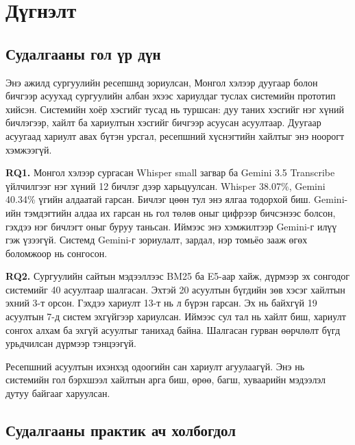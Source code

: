 \chapter{Дүгнэлт}
\label{ch:conclusion}


\section{Судалгааны гол үр дүн}
\label{sec:concl-main}

Энэ ажилд сургуулийн ресепшнд зориулсан, Монгол хэлээр дуугаар болон бичгээр асуухад сургуулийн албан эхээс хариулдаг туслах системийн прототип хийсэн. Системийн хоёр хэсгийг тусад нь туршсан: дуу таних хэсгийг нэг хүний бичлэгээр, хайлт ба хариултын хэсгийг бичгээр асуусан асуултаар. Дуугаар асуугаад хариулт авах бүтэн урсгал, ресепшний хүснэгтийн хайлтыг энэ ноорогт хэмжээгүй.

\textbf{RQ1.} Монгол хэлээр сургасан Whisper small загвар ба Gemini 3.5 Transcribe үйлчилгээг нэг хүний 12 бичлэг дээр харьцуулсан. Whisper 38.07\%, Gemini 40.34\% үгийн алдаатай гарсан. Бичлэг цөөн тул энэ ялгаа тодорхой биш. Gemini-ийн тэмдэгтийн алдаа их гарсан нь гол төлөв оныг цифрээр бичсэнээс болсон, гэхдээ нэг бичлэгт оныг буруу таньсан. Иймээс энэ хэмжилтээр Gemini-г илүү гэж үзээгүй. Системд Gemini-г зориулалт, зардал, нэр томьёо зааж өгөх боломжоор нь сонгосон.

\textbf{RQ2.} Сургуулийн сайтын мэдээллээс BM25 ба E5-аар хайж, дүрмээр эх сонгодог системийг 40 асуултаар шалгасан. Эхтэй 20 асуултын бүгдийн зөв хэсэг хайлтын эхний 3-т орсон. Гэхдээ хариулт 13-т нь л бүрэн гарсан. Эх нь байхгүй 19 асуултын 7-д систем эхгүйгээр хариулсан. Иймээс сул тал нь хайлт биш, хариулт сонгох алхам ба эхгүй асуултыг танихад байна. Шалгасан гурван өөрчлөлт бүгд урьдчилсан дүрмээр тэнцээгүй.

Ресепшний асуултын ихэнхэд одоогийн сан хариулт агуулаагүй. Энэ нь системийн гол бэрхшээл хайлтын арга биш, өрөө, багш, хуваарийн мэдээлэл дутуу байгааг харуулсан.

\section{Судалгааны практик ач холбогдол}
\label{sec:concl-practical}

